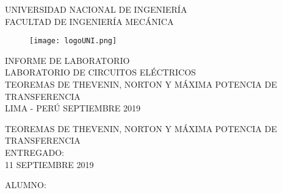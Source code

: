 \documentclass[a4paper,12pt]{report}
\begin{document}
\setcounter{page}{1}
\thispagestyle{empty}
\begin{center}
{\huge UNIVERSIDAD NACIONAL DE INGENIERÍA}\\[0.9cm]
{\Large FACULTAD DE INGENIERÍA MECÁNICA}\\[0.6in]
\end{center}
\begin{figure}[h]
\begin{center}
\texttt{[image: logoUNI.png]}
\vspace{0cm}
\end{center}
\end{figure}
\vspace{0.5cm}
\begin{center}
INFORME DE LABORATORIO\\
LABORATORIO DE CIRCUITOS ELÉCTRICOS\\[5mm]
{\large TEOREMAS DE THEVENIN, NORTON Y MÁXIMA POTENCIA DE TRANSFERENCIA}\\[10mm]
\vfill
LIMA - PERÚ \hfill SEPTIEMBRE 2019
\end{center}
\newpage
\thispagestyle{empty}
\begin{center}
{\Huge TEOREMAS DE THEVENIN, NORTON Y MÁXIMA POTENCIA DE TRANSFERENCIA}\\[0.7cm]
\small ENTREGADO:\\[0.05cm]
\small 11 SEPTIEMBRE 2019\\[1.2cm]
\end{center}
\begin{flushleft}
{\large ALUMNO:}\\[2cm]
\end{flushleft}
\end{document}
